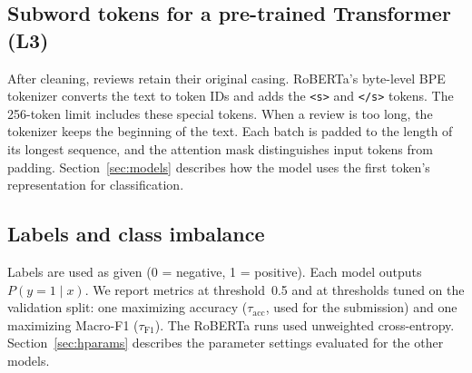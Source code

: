 \subsection{Subword tokens for a pre-trained Transformer (L3)}
After cleaning, reviews retain their original casing. RoBERTa's
byte-level BPE tokenizer converts the text to token IDs and adds the
\texttt{<s>} and \texttt{</s>} tokens. The 256-token limit includes
these special tokens. When a review is too long, the tokenizer keeps
the beginning of the text. Each batch is padded to the length of its
longest sequence, and the attention mask distinguishes input tokens
from padding. Section~\ref{sec:models} describes how the model uses the first token's
representation for classification.

\subsection{Labels and class imbalance}
Labels are used as given (0 = negative, 1 = positive).
Each model outputs $P(y{=}1\mid x)$. We report metrics at threshold~0.5 and at thresholds tuned on the validation split: one maximizing accuracy ($\tau_{\mathrm{acc}}$, used for the submission) and one maximizing Macro-F1 ($\tau_{\mathrm{F1}}$).
The RoBERTa runs used unweighted cross-entropy. Section~\ref{sec:hparams} describes the parameter settings evaluated for the other models.
